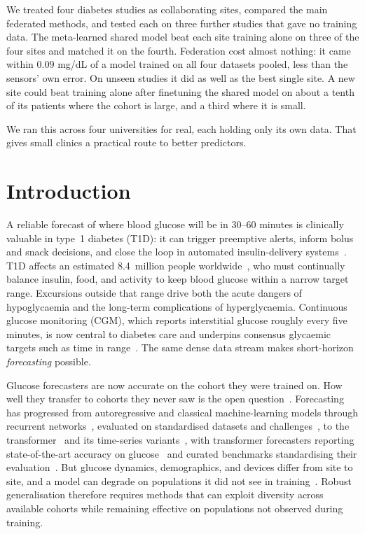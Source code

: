 \documentclass[10pt,letterpaper]{article}
\begin{document}
We treated four diabetes studies as collaborating sites, compared the main
federated methods, and tested each on three further studies that gave no
training data. The meta-learned shared model beat each site training alone
on three of the four sites and matched it on the fourth. Federation cost almost nothing: it came within $0.09$ mg/dL
of a model trained on all four datasets pooled, less than the sensors' own
error. On unseen studies it did as well as the best single site. A new site
could beat training alone after finetuning the shared model on about a tenth
of its patients where the cohort is large, and a third where it is small.

We ran this across four universities for real, each holding only its own data.
That gives small clinics a practical route to better predictors.

\clearpage
{}
\linenumbers

\section*{Introduction}

A reliable forecast of where blood glucose will be in 30--60 minutes is
clinically valuable in type~1 diabetes (T1D): it can trigger preemptive
alerts, inform bolus and snack decisions, and close the loop in automated
insulin-delivery systems~\cite{vettoretti2020advanced,bekiari2018ap}. T1D
affects an estimated 8.4~million people
worldwide~\cite{idf2021,gregory2022t1dindex}, who must continually balance
insulin, food, and activity to keep blood glucose within a narrow target
range. Excursions outside that range drive both the acute dangers of
hypoglycaemia and the long-term complications of hyperglycaemia. Continuous
glucose monitoring (CGM), which reports interstitial glucose roughly every
five minutes, is now central to diabetes care and underpins consensus
glycaemic targets such as time in range~\cite{battelino2019tir}. The same
dense data stream makes short-horizon \emph{forecasting} possible.

Glucose forecasters are now accurate on the cohort they were trained on. How
well they transfer to cohorts they never saw is the open
question~\cite{ghimire2024generalize}. Forecasting has progressed from
autoregressive and classical machine-learning models through recurrent
networks~\cite{martinsson2020}, evaluated on standardised datasets and
challenges~\cite{marling2020ohio}, to the
transformer~\cite{vaswani2017attention} and its time-series
variants~\cite{zhou2021informer,wu2021autoformer}, with transformer
forecasters reporting state-of-the-art accuracy on
glucose~\cite{sergazinov2023gluformer} and curated benchmarks standardising
their evaluation~\cite{sergazinov2024glucobench}. But glucose dynamics,
demographics, and devices differ from site to site, and a model can degrade
on populations it did not see in training~\cite{farahmand2025glumind}.
Robust generalisation therefore requires methods that can exploit diversity
across available cohorts while remaining effective on populations not
observed during training.
\end{document}
